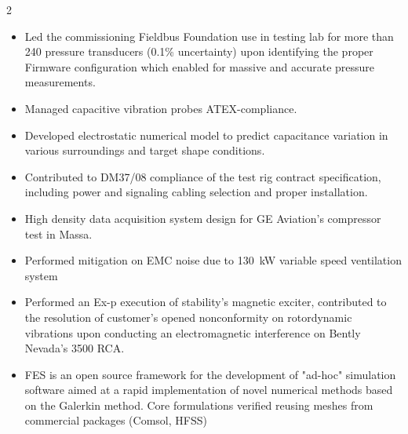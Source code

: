 \documentclass[9pt,a4paper,ragged2e,withhyper]{altacv} %
\begin{document}
\begin{paracol}{2}
\begin{itemize}
\item Led the commissioning Fieldbus Foundation use in testing lab for more than 240 pressure transducers (0.1\% uncertainty) upon identifying the proper Firmware configuration which enabled for massive and accurate pressure measurements.
\item Managed capacitive vibration probes ATEX-compliance.
\item Developed electrostatic numerical model to predict capacitance variation in various surroundings and target shape conditions.
\item Contributed to DM37/08 compliance of the test rig contract specification, including power and signaling cabling selection and proper installation.
\end{itemize}
\divider

\begin{itemize}
\item High density data acquisition system design for GE Aviation's compressor test in Massa.
\item Performed mitigation on EMC noise due to 130~kW variable speed ventilation system
\end{itemize}


\divider

\begin{itemize}
\item Performed an Ex-p execution of stability's magnetic exciter, contributed to the resolution of customer's opened nonconformity on rotordynamic vibrations upon conducting an electromagnetic interference on Bently Nevada's 3500 RCA.
\end{itemize}
\divider

\begin{itemize}
\item FES is an open source framework for the development of "ad-hoc" simulation software aimed at a rapid implementation of novel numerical methods based on the Galerkin method. Core formulations verified reusing meshes from commercial packages (Comsol, HFSS)
\end{itemize}
\divider


\end{paracol}
\end{document}
